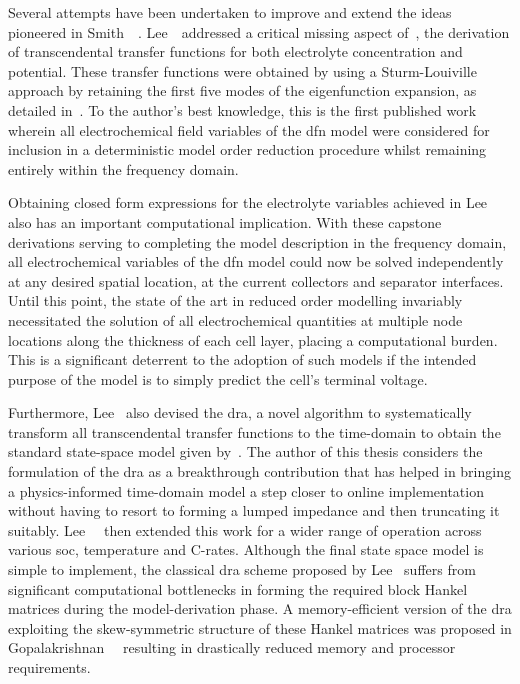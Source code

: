Several attempts have been undertaken to  improve and extend the ideas pioneered
in  Smith~\etal{}~\cite{Smith2007}.  Lee~\etal{}~addressed  a  critical  missing
aspect  of~\cite{Smith2007}, \viz{}  the derivation  of transcendental  transfer
functions  for  both electrolyte  concentration  and  potential. These  transfer
functions were  obtained by  using a Sturm-Louiville  approach by  retaining the
first five modes of the  eigenfunction expansion, as detailed in~\cite{Lee2012}.
To the  author's best knowledge,  this is the  first published work  wherein all
electrochemical  field variables  of  the \gls{dfn}  model  were considered  for
inclusion in  a deterministic model  order reduction procedure  whilst remaining
entirely within the frequency domain.

Obtaining  closed form  expressions for  the electrolyte  variables achieved  in
Lee~\etal{} also has an important computational implication. With these capstone
derivations serving to completing the model description in the frequency domain,
all  electrochemical  variables of  the  \gls{dfn}  model  could now  be  solved
independently at any  desired spatial location, \eg{} at  the current collectors
and separator  interfaces. Until  this point,  the state of  the art  in reduced
order  modelling invariably  necessitated  the solution  of all  electrochemical
quantities at  multiple node locations along  the thickness of each  cell layer,
placing a computational burden. This is  a significant deterrent to the adoption
of such  models if the intended  purpose of the  model is to simply  predict the
cell's terminal voltage.


Furthermore,  Lee~\etal{}   also  devised  the  \gls{dra},   a  novel  algorithm
to  systematically  transform  all  transcendental  transfer  functions  to  the
time-domain to  obtain the standard state-space  model given by~\cite{Lee2012a}.
The  author of  this thesis  considers  the formulation  of the  \gls{dra} as  a
breakthrough  contribution  that  has  helped  in  bringing  a  physics-informed
time-domain  model  a  step  closer  to  online  implementation  without  having
to  resort to  forming  a  lumped impedance  and  then  truncating it  suitably.
Lee~\etal{}~\cite{Lee2014}  then  extended  this  work  for  a  wider  range  of
operation  across  various  \gls{soc},  temperature and  C-rates.  Although  the
final  state  space  model  is  simple to  implement,  the  classical  \gls{dra}
scheme   proposed  by   Lee~\etal{}   suffers   from  significant   computational
bottlenecks  in   forming  the  required   block  Hankel  matrices   during  the
model-derivation phase.  A memory-efficient version of  the \gls{dra} exploiting
the   skew-symmetric   structure  of   these   Hankel   matrices  was   proposed
in  Gopalakrishnan~\etal{}~\cite{Gopalakrishnan2017}  resulting  in  drastically
reduced memory and processor requirements.

